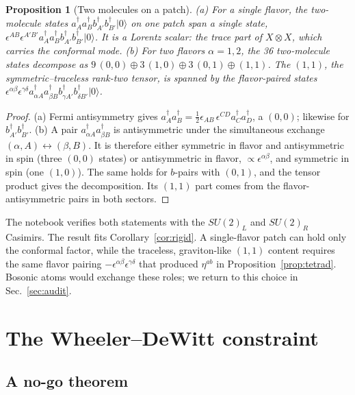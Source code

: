 \documentclass[reprint,aps,prd,amsmath,amssymb,superscriptaddress,nofootinbib,floatfix]{revtex4-2}
\theoremstyle{plain}
\newtheorem{proposition}{Proposition}
\theoremstyle{definition}
\theoremstyle{remark}
\newcommand{\Mol}{\ensuremath{X}}                 %
\newcommand{\ket}[1]{\ensuremath{|#1\rangle}}
\begin{document}
\begin{proposition}[Two molecules on a patch]
\label{prop:11}
(a) For a single flavor, the two-molecule states $a^\dagger_Aa^\dagger_Bb^\dagger_{A'}b^\dagger_{B'}\ket0$ on one patch span
a single state, $\epsilon^{AB}\epsilon^{A'B'}a^\dagger_Aa^\dagger_Bb^\dagger_{A'}b^\dagger_{B'}\ket0$. It is a Lorentz scalar: the
trace part of $\Mol\otimes\Mol$, which carries the conformal mode.
(b) For two flavors $\alpha=1,2$, the 36 two-molecule states decompose as $9\,(0,0)\oplus3\,(1,0)\oplus3\,(0,1)\oplus(1,1)$.
The $(1,1)$, the symmetric--traceless rank-two tensor, is spanned by the flavor-paired states
$\epsilon^{\alpha\beta}\epsilon^{\gamma\delta}a^\dagger_{\alpha A}a^\dagger_{\beta B}b^\dagger_{\gamma A'}b^\dagger_{\delta B'}\ket0$.
\end{proposition}
\begin{proof}
(a) Fermi antisymmetry gives $a^\dagger_Aa^\dagger_B=\tfrac12\epsilon_{AB}\,\epsilon^{CD}a^\dagger_Ca^\dagger_D$, a $(0,0)$; likewise
for $b^\dagger_{A'}b^\dagger_{B'}$. (b) A pair $a^\dagger_{\alpha A}a^\dagger_{\beta B}$ is antisymmetric under the simultaneous exchange
$(\alpha,A)\leftrightarrow(\beta,B)$. It is therefore either symmetric in flavor and antisymmetric in spin (three
$(0,0)$ states) or antisymmetric in flavor, $\propto\epsilon^{\alpha\beta}$, and symmetric in spin (one $(1,0)$). The same holds
for $b$-pairs with $(0,1)$, and the tensor product gives the decomposition. Its $(1,1)$ part comes from the
flavor-antisymmetric pairs in both sectors.
\end{proof}
The notebook verifies both statements with the $SU(2)_L$ and $SU(2)_R$ Casimirs. The result fits
Corollary~\ref{cor:rigid}. A single-flavor patch can hold only the conformal factor, while the traceless,
graviton-like $(1,1)$ content requires the same flavor pairing $-\epsilon^{\alpha\beta}\epsilon^{\gamma\delta}$ that produced
$\eta^{ab}$ in Proposition~\ref{prop:tetrad}. Bosonic atoms would exchange these roles; we return to this choice in
Sec.~\ref{sec:audit}.

\section{The Wheeler--DeWitt constraint}
\label{sec:wdw}

\subsection{A no-go theorem}
\end{document}

